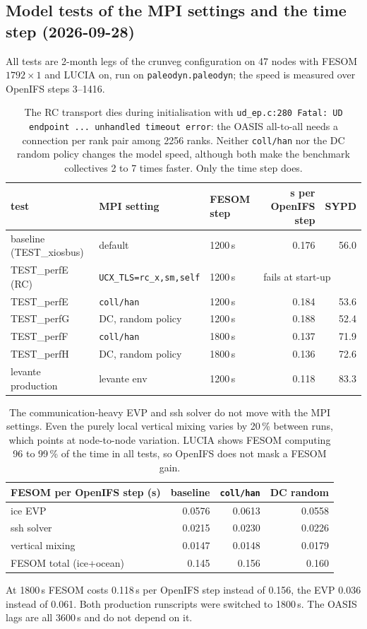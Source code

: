 \documentclass[11pt,a4paper]{article}
\begin{document}
\subsection{Model tests of the MPI settings and the time step (2026-09-28)}
All tests are 2-month legs of the crunveg configuration on 47 nodes with FESOM $1792\times1$ and LUCIA on, run on \texttt{paleodyn.paleodyn}; the speed is measured over OpenIFS steps 3--1416.
\begin{table}[H]\centering\small
\begin{tabular}{lllrr}\toprule
test & MPI setting & FESOM step & s per OpenIFS step & SYPD\\\midrule
baseline (TEST\_xiosbus) & default & 1200\,s & 0.176 & 56.0\\
TEST\_perfE (RC) & \texttt{UCX\_TLS=rc\_x,sm,self} & 1200\,s & \multicolumn{2}{l}{fails at start-up}\\
TEST\_perfE & \texttt{coll/han} & 1200\,s & 0.184 & 53.6\\
TEST\_perfG & DC, random policy & 1200\,s & 0.188 & 52.4\\
TEST\_perfF & \texttt{coll/han} & 1800\,s & 0.137 & 71.9\\
TEST\_perfH & DC, random policy & 1800\,s & 0.136 & 72.6\\
levante production & levante env & 1200\,s & 0.118 & 83.3\\\bottomrule
\end{tabular}
\caption{The RC transport dies during initialisation with \texttt{ud\_ep.c:280 Fatal: UD endpoint ... unhandled timeout error}: the OASIS all-to-all needs a connection per rank pair among 2256 ranks. Neither \texttt{coll/han} nor the DC random policy changes the model speed, although both make the benchmark collectives 2 to 7 times faster. Only the time step does.}
\end{table}
\begin{table}[H]\centering\small
\begin{tabular}{lrrr}\toprule
FESOM per OpenIFS step (s) & baseline & \texttt{coll/han} & DC random\\\midrule
ice EVP & 0.0576 & 0.0613 & 0.0558\\
ssh solver & 0.0215 & 0.0230 & 0.0226\\
vertical mixing & 0.0147 & 0.0148 & 0.0179\\
FESOM total (ice+ocean) & 0.145 & 0.156 & 0.160\\\bottomrule
\end{tabular}
\caption{The communication-heavy EVP and ssh solver do not move with the MPI settings. Even the purely local vertical mixing varies by 20\,\% between runs, which points at node-to-node variation. LUCIA shows FESOM computing 96 to 99\,\% of the time in all tests, so OpenIFS does not mask a FESOM gain.}
\end{table}
At 1800\,s FESOM costs 0.118\,s per OpenIFS step instead of 0.156, the EVP 0.036 instead of 0.061. Both production runscripts were switched to 1800\,s. The OASIS lags are all 3600\,s and do not depend on it.
\end{document}
